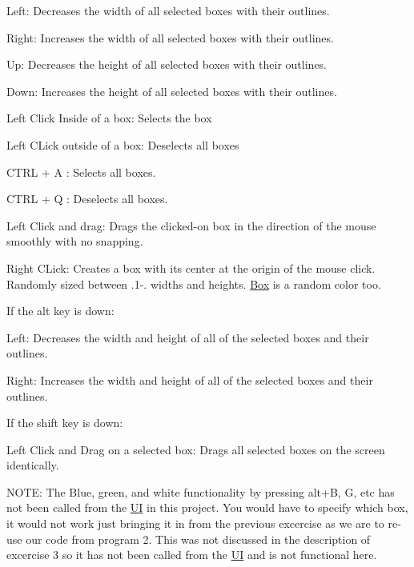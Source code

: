 \begin{DoxyItemize}
\item Left\+: Decreases the width of all selected boxes with their outlines.
\item Right\+: Increases the width of all selected boxes with their outlines.
\item Up\+: Decreases the height of all selected boxes with their outlines.
\item Down\+: Increases the height of all selected boxes with their outlines.
\item Left Click Inside of a box\+: Selects the box
\item Left C\+Lick outside of a box\+: Deselects all boxes
\item C\+T\+RL + A \+: Selects all boxes.
\item C\+T\+RL + Q \+: Deselects all boxes.
\item Left Click and drag\+: Drags the clicked-\/on box in the direction of the mouse smoothly with no snapping.
\item Right C\+Lick\+: Creates a box with it\textquotesingle{}s center at the origin of the mouse click. Randomly sized between .1-\/. widths and heights. \hyperlink{class_box}{Box} is a random color too.
\end{DoxyItemize}

If the alt key is down\+:


\begin{DoxyItemize}
\item Left\+: Decreases the width and height of all of the selected boxes and their outlines.
\item Right\+: Increases the width and height of all of the selected boxes and their outlines.
\end{DoxyItemize}

If the shift key is down\+:


\begin{DoxyItemize}
\item Left Click and Drag on a selected box\+: Drags all selected boxes on the screen identically.
\end{DoxyItemize}

N\+O\+TE\+: The Blue, green, and white functionality by pressing alt+B, G, etc has not been called from the \hyperlink{class_u_i}{UI} in this project. You would have to specify which box, it would not work just bringing it in from the previous excercise as we are to re-\/use our code from program 2. This was not discussed in the description of excercise 3 so it has not been called from the \hyperlink{class_u_i}{UI} and is not functional here.

